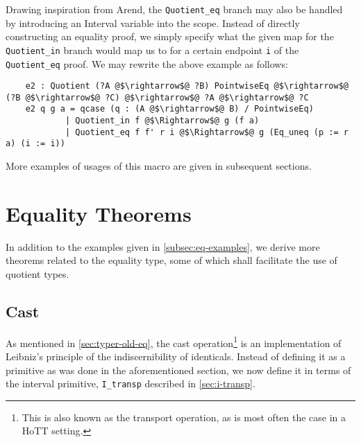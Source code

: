 \documentclass[12pt,twoside,maitrise]{dms}
\theoremstyle{definition}
\numberwithin{equation}{section}
\numberwithin{table}{chapter}
\numberwithin{figure}{chapter}
\newcommand\id[1] {\texttt{#1}}
\begin{document}
Drawing inspiration from Arend, the \id{Quotient\_eq} branch may also be handled
by introducing an Interval variable into the scope. Instead of directly
constructing an equality proof, we simply specify what the given map for the
\id{Quotient\_in} branch would map us to for a certain endpoint \id{i} of the
\id{Quotient\_eq} proof. We may rewrite the above example as follows:


\begin{verbatim}
    e2 : Quotient (?A @$\rightarrow$@ ?B) PointwiseEq @$\rightarrow$@ (?B @$\rightarrow$@ ?C) @$\rightarrow$@ ?A @$\rightarrow$@ ?C
    e2 q g a = qcase (q : (A @$\rightarrow$@ B) / PointwiseEq)
            | Quotient_in f @$\Rightarrow$@ g (f a)
            | Quotient_eq f f' r i @$\Rightarrow$@ g (Eq_uneq (p := r a) (i := i))
\end{verbatim}

More examples of usages of this macro are given in subsequent sections.

\chapter{Equality Theorems}\label{ch:eq-theorems}
In addition to the examples given in \autoref{subsec:eq-examples}, we derive
more theorems related to the equality type, some of which shall facilitate the
use of quotient types.

\section{Cast}\label{sec:eq-transport}
As mentioned in \autoref{sec:typer-old-eq}, the cast operation\footnote{This is
also known as the transport operation, as is most often the case in a HoTT
setting.} is an implementation of Leibniz's principle of the indiscernibility of
identicals. Instead of defining it as a primitive as was done in the
aforementioned section, we now define it in terms of the interval primitive,
\id{I\_transp} described in \autoref{sec:i-transp}.
\end{document}
